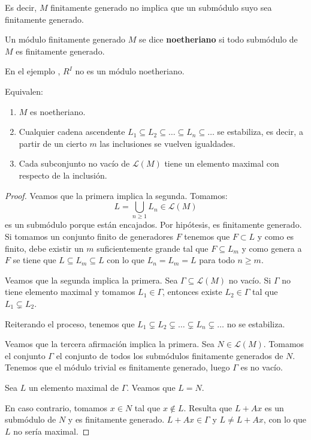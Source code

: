 Es decir, \(M\) finitamente generado no implica que un submódulo suyo
sea finitamente generado.

\begin{df}
  Un módulo finitamente generado \(M\) se dice \textbf{noetheriano} si todo
  submódulo de \(M\) es finitamente generado.
\end{df}

En el ejemplo \label{ejemplo:no_noe}, \(R^I\) no es un módulo noetheriano.

\begin{prop}\label{prop:noether}
  Equivalen:
  \begin{enumerate}
    \item \(M\) es noetheriano.
    \item Cualquier cadena ascendente \(L_1\subseteq L_2\subseteq\ldots
      \subseteq L_n\subseteq\ldots\) se estabiliza, es decir,
      a partir de un cierto \(m\) las inclusiones se vuelven igualdades.
    \item Cada subconjunto no vacío de \(\mathcal{L}(M)\) tiene un elemento
      maximal con respecto de la inclusión.
  \end{enumerate}
\end{prop}

\begin{proof}
  Veamos que la primera implica la segunda.
  Tomamos:
  \[
    L=\bigcup_{n\ge 1} L_n\in\mathcal{L}(M)
  \]
  es un submódulo porque están encajados. Por hipótesis, es finitamente
  generado. Si tomamos un conjunto finito de generadores \(F\)
  tenemos que \(F\subset L\) y como es finito, debe existir un \(m\)
  suficientemente grande tal que \(F\subseteq L_m\) y como
  genera a \(F\) se tiene que \(L\subseteq L_m\subseteq L\)
  con lo que \(L_n=L_m=L\) para todo \(n\ge m\).

  Veamos que la segunda implica la primera. Sea \(\Gamma\subseteq
  \mathcal{L}(M)\) no vacío. Si \(\Gamma\) no tiene elemento maximal
  y tomamos \(L_1\in\Gamma\), entonces existe \(L_2\in\Gamma\)
  tal que \(L_1\subsetneq L_2\).

  Reiterando el proceso, tenemos que \(L_1\subsetneq L_2\subsetneq
  \ldots\subsetneq L_n\subsetneq\ldots\) no se estabiliza.

  Veamos que la tercera afirmación implica la primera.
  Sea \(N\in\mathcal{L}(M)\).
  Tomamos el conjunto \(\Gamma\) el conjunto de todos los submódulos
  finitamente generados de \(N\). Tenemos que el módulo trivial
  es finitamente generado, luego \(\Gamma\) es no vacío.

  Sea \(L\) un elemento maximal de \(\Gamma\). Veamos que \(L=N\).

  En caso contrario, tomamos \(x\in N\) tal que \(x\notin L\). Resulta que
  \(L+Ax\) es un submódulo de \(N\) y es finitamente generado.
  \(L+Ax\in\Gamma\) y \(L\neq L+Ax\), con lo que \(L\) no sería maximal.
\end{proof}

